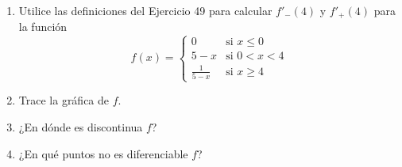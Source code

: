 \item 
    \begin{enumerate}
        \item Utilice las definiciones del Ejercicio 49 para calcular $f'_-(4)$ y $f'_+(4)$ para la función
        $$f(x) = \begin{cases} 
        0 & \text{si } x \le 0 \\ 
        5 - x & \text{si } 0 < x < 4 \\ 
        \frac{1}{5 - x} & \text{si } x \ge 4 
        \end{cases}$$
        \item Trace la gráfica de $f$.
        \item ¿En dónde es discontinua $f$?
        \item ¿En qué puntos no es diferenciable $f$?
    \end{enumerate}

